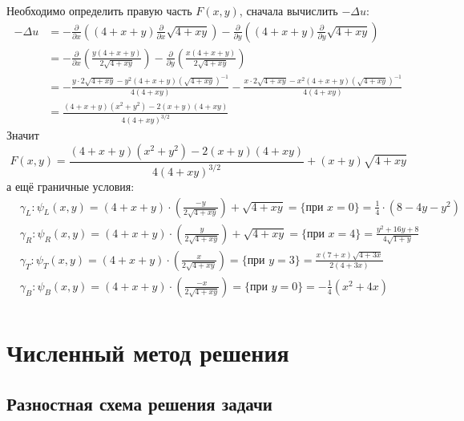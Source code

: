 \documentclass{article}
\begin{document}
Необходимо определить правую часть $F(x,y)$, сначала вычислить $-\Delta u$:
\begin{equation*}
\begin{aligned}
    - \Delta u &= - \frac{\partial}{\partial x} \left((4+x+y)\frac{\partial}{\partial x}\sqrt{4+xy} \right) - \frac{\partial}{\partial y}\left((4+x+y)\frac{\partial}{\partial y}\sqrt{4+xy} \right) \\
    &= - \frac{\partial}{\partial x} \left(\frac{y(4+x+y)}{2\sqrt{4+xy}}\right) - \frac{\partial}{\partial y} \left(\frac{x(4+x+y)}{2\sqrt{4+xy}}\right) \\
    &= - \frac{y\cdot 2\sqrt{4+xy}-y^2(4+x+y)(\sqrt{4+xy})^{-1}}{4(4+xy)} - \frac{x\cdot 2\sqrt{4+xy}-x^2(4+x+y)(\sqrt{4+xy})^{-1}}{4(4+xy)} \\
    &= \frac{(4+x+y)(x^2+y^2)-2(x+y)(4+xy)}{4(4+xy)^{3/2}}
\end{aligned}
\end{equation*}
Значит
\begin{equation*}
    F(x,y) = \frac{(4+x+y)(x^2+y^2)-2(x+y)(4+xy)}{4(4+xy)^{3/2}} + (x+y)\sqrt{4+xy}
\end{equation*}
а ещё граничные условия:
\begin{equation*}
\begin{aligned}
    &\gamma_L: \psi_L(x,y) = (4+x+y)\cdot\left(\frac{-y}{2\sqrt{4+xy}}\right) + \sqrt{4+xy} = \{ \text{при } x=0\} = \frac{1}{4}\cdot(8-4y-y^2)\\
    &\gamma_R: \psi_R(x,y) = (4+x+y)\cdot\left(\frac{y}{2\sqrt{4+xy}}\right) + \sqrt{4+xy} = \{ \text{при } x=4\} = \frac{y^2+16y+8}{4\sqrt{1+y}}\\
    &\gamma_T: \psi_T(x,y) = (4+x+y)\cdot\left(\frac{x}{2\sqrt{4+xy}}\right) = \{ \text{при } y=3\} = \frac{x(7+x)\sqrt{4+3x}}{2(4+3x)}\\
    &\gamma_B: \psi_B(x,y) = (4+x+y)\cdot\left(\frac{-x}{2\sqrt{4+xy}}\right) = \{ \text{при } y=0\} = -\frac{1}{4}(x^2+4x)\\
\end{aligned}
\end{equation*}


\section{Численный метод решения}
\subsection{Разностная схема решения задачи}
\end{document}
